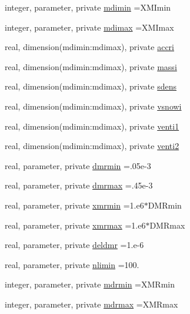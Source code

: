 \begin{DoxyCompactItemize}
integer, parameter, private \hyperlink{namespacemodule__microphysics_a81bcf203ed1a75b10ea2c7f97ac56a21}{mdimin} =X\+M\+Imin
\item 
integer, parameter, private \hyperlink{namespacemodule__microphysics_a28b728213c1425c1bd5c05c9a469b92a}{mdimax} =X\+M\+Imax
\item 
real, dimension(mdimin\+:mdimax), private \hyperlink{namespacemodule__microphysics_a85112c2881ca373d648a39bd0c5843fa}{accri}
\item 
real, dimension(mdimin\+:mdimax), private \hyperlink{namespacemodule__microphysics_a399ef7965cf1f4f6e4aef482e33f9b16}{massi}
\item 
real, dimension(mdimin\+:mdimax), private \hyperlink{namespacemodule__microphysics_ab31a2c459480d3b9ba2388d3f60db179}{sdens}
\item 
real, dimension(mdimin\+:mdimax), private \hyperlink{namespacemodule__microphysics_acd06af071ee4f0a5bb4599f239916dd7}{vsnowi}
\item 
real, dimension(mdimin\+:mdimax), private \hyperlink{namespacemodule__microphysics_a420fb71de46ebdf9a097147bf9f9debe}{venti1}
\item 
real, dimension(mdimin\+:mdimax), private \hyperlink{namespacemodule__microphysics_a340e6633b234e32289115c3ff08277c5}{venti2}
\item 
real, parameter, private \hyperlink{namespacemodule__microphysics_a67a841cda9f172633fa4895d1a3433e7}{dmrmin} =.\+05e-\/3
\item 
real, parameter, private \hyperlink{namespacemodule__microphysics_a5faae0c4f54f72f04b2874f5588276f5}{dmrmax} =.\+45e-\/3
\item 
real, parameter, private \hyperlink{namespacemodule__microphysics_a77fb6cadd143fc66a45cfdae1569cd81}{xmrmin} =1.e6$\ast$D\+M\+Rmin
\item 
real, parameter, private \hyperlink{namespacemodule__microphysics_ad2c7abf18a4c75103e965cb9c856e6f7}{xmrmax} =1.e6$\ast$D\+M\+Rmax
\item 
real, parameter, private \hyperlink{namespacemodule__microphysics_a8196aeaa83acb0941194563281aa721b}{deldmr} =1.e-\/6
\item 
real, parameter, private \hyperlink{namespacemodule__microphysics_a9a5f8e03c03725a03b9fc923d095e31a}{nlimin} =100.
\item 
integer, parameter, private \hyperlink{namespacemodule__microphysics_aa9201f3dba87b517d0fe88af177c4281}{mdrmin} =X\+M\+Rmin
\item 
integer, parameter, private \hyperlink{namespacemodule__microphysics_aa21f2a4aa4dc086cbe80493ae7da6b8b}{mdrmax} =X\+M\+Rmax

\end{DoxyCompactItemize}
